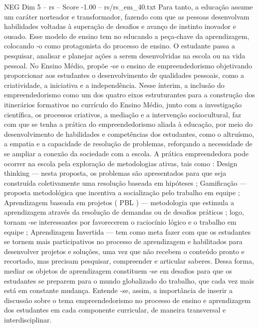 \begin{textsample}{NEG Dim 5 – rs – Score -1.00 – rs/rs\_em\_40.txt}
Para tanto, a educação assume um caráter norteador e transformador, fazendo com que as pessoas desenvolvam habilidades voltadas à superação de desafios e avanço de instinto inovador e ousado.
Esse modelo de ensino tem no educando a peça-chave da aprendizagem, colocando -o como protagonista do processo de ensino.
O estudante passa a pesquisar, analisar e planejar ações a serem desenvolvidas na escola ou na vida pessoal.
No Ensino Médio, propõe -se o ensino de empreendedorismo objetivando proporcionar aos estudantes o desenvolvimento de qualidades pessoais, como a criatividade, a iniciativa e a independência.
Nesse ínterim, a inclusão do empreendedorismo como um dos quatro eixos estruturantes para a construção dos itinerários formativos no currículo do Ensino Médio, junto com a investigação científica, os processos criativos, a mediação e a intervenção sociocultural, faz com que se tenha a prática do empreendedorismo aliada à educação, por meio do desenvolvimento de habilidades e competências dos estudantes, como o altruísmo, a empatia e a capacidade de resolução de problemas, reforçando a necessidade de se ampliar a conexão da sociedade com a escola.
A prática empreendedora pode ocorrer na escola pela exploração de metodologias ativas, tais como : Design thinking — nesta proposta, os problemas são apresentados para que seja construída coletivamente uma resolução baseada em hipóteses ; Gamificação — proposta metodológica que incentiva a socialização pelo trabalho em equipe ; Aprendizagem baseada em projetos ( PBL ) — metodologia que estimula a aprendizagem através da resolução de demandas ou de desafios práticos ; logo, tornam -se interessantes por favorecerem o raciocínio lógico e o trabalho em equipe ; Aprendizagem Invertida — tem como meta fazer com que os estudantes se tornem mais participativos no processo de aprendizagem e habilitados para desenvolver projetos e soluções, uma vez que não recebem o conteúdo pronto e recortado, mas precisam pesquisar, compreender e articular saberes.
Dessa forma, mediar os objetos de aprendizagem constituem -se em desafios para que os estudantes se preparem para o mundo globalizado do trabalho, que cada vez mais está em constante mudança.
Entende -se, assim, a importância de inserir a discussão sobre o tema empreendedorismo no processo de ensino e aprendizagem dos estudantes em cada componente curricular, de maneira transversal e interdisciplinar.

\end{textsample}
